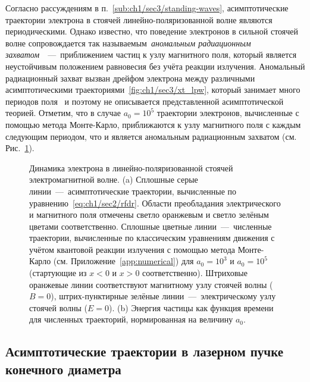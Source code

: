 Согласно рассуждениям в п.~\ref{sub:ch1/sec3/standing-waves}, асимптотические траектории электрона в стоячей линейно-поляризованной волне являются периодическими.
Однако известно, что поведение электронов в сильной стоячей волне сопровождается так называемым~\textit{аномальным радиационным захватом}~\cite{Gonoskov14}~---~приближением частиц к узлу магнитного поля, который является неустойчивым положением равновесия без учёта реакции излучения.
Аномальный радиационный захват вызван дрейфом электрона между различными асимптотическими траекториями~\eqref{fig:ch1/sec3/xt_lpw}, который занимает много периодов поля~\cite{Gonoskov14} и поэтому не описывается представленной асимптотической теорией.
Отметим, что в случае $a_0 = 10^5$ траектории электронов, вычисленные с помощью метода Монте-Карло, приближаются к узлу магнитного поля с каждым следующим периодом, что и является аномальным радиационным захватом (см. Рис.~\ref{fig:ch1/sec3/onion}).

\begin{figure}[ht]
    \caption[Динамика электрона в линейно-поляризованной стоячей электромагнитной волне]{Динамика электрона в линейно-поляризованной стоячей электромагнитной волне. (a) Сплошные серые линии~---~асимптотические траектории, вычисленные по уравнению~\eqref{eq:ch1/sec2/rfdr}. Области преобладания электрического и магнитного поля отмечены светло оранжевым и светло зелёным цветами соответственно. Сплошные цветные линии~---~численные траектории, вычисленные по классическим уравнениям движения с учётом квантовой реакции излучения с помощью метода Монте-Карло (см. Приложение~\ref{app:numerical}) для $a_0 = 10^3$ и $a_0 = 10^5$ (стартующие из $x < 0$ и $x > 0$ соответственно). Штриховые оранжевые линии соответствуют магнитному узлу стоячей волны ($B = 0$), штрих-пунктирные зелёные линии~---~электрическому узлу стоячей волны ($E=0$).
    (b) Энергия частицы как функция времени для численных траекторий, нормированная на величину $a_0$.}
    \label{fig:ch1/sec3/onion}
\end{figure}

\subsection{Асимптотические траектории в лазерном пучке конечного диаметра}
\label{sub:ch1/TE11}

